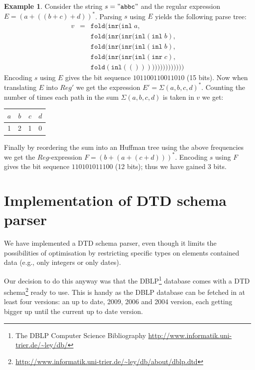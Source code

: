 \documentclass[a4paper, oneside]{memoir}
\theoremstyle{definition}
\newtheorem{example}{Example}
\begin{document}
\begin{example}
  Consider the string $s = \mathtt{"abbc"}$ and the regular expression $E = (a +
  ((b + c) + d))^{*}$. Parsing $s$ using $E$ yields the following parse tree:
\[
\begin{array}{rcl}
  v & = & \mathtt{fold}(\mathtt{inr}(\mathtt{inl} \; a, \\
    &   & \mathtt{fold}(\mathtt{inr}(\mathtt{inr}(\mathtt{inl}(\mathtt{inl} \; b), \\
    &   & \mathtt{fold}(\mathtt{inr}(\mathtt{inr}(\mathtt{inl}(\mathtt{inl} \; b), \\
    &   & \mathtt{fold}(\mathtt{inr}(\mathtt{inr}(\mathtt{inl}(\mathtt{inr} \; c), \\
    &   & \mathtt{fold}(\mathtt{inl}(()))))))))))))))
\end{array}
\]
\noindent Encoding $s$ using $E$ gives the bit sequence $101100110011010$ (15
bits). Now when translating $E$ into $Reg'$ we get the expression $E' =
\Sigma{(a, b, c, d)}^{*}$. Counting the number of times each path in the sum
$\Sigma{(a, b, c, d)}$ is taken in $v$ we get:

\begin{center}
\begin{tabular}{c|c|c|c}
$a$ & $b$ & $c$ & $d$ \\
\hline
1   & 2   & 1   & 0
\end{tabular}
\end{center}

\noindent Finally by reordering the sum into an Huffman tree using the above
frequencies we get the $Reg$-expression $F = (b + (a + (c + d)))^{*}$. Encoding
$s$ using $F$ gives the bit sequence $110101011100$ (12 bits); thus we have
gained 3 bits.

\end{example}

\chapter{Implementation of DTD schema parser}

We have implemented a DTD schema parser, even though it limits the possibilities
of optimisation by restricting specific types on elements contained data (e.g.,
only integers or only dates).

Our decision to do this anyway was that the DBLP\footnote{The DBLP Computer
  Science Bibliography \url{http://www.informatik.uni-trier.de/~ley/db/}}
database comes with a DTD
schema\footnote{\url{http://www.informatik.uni-trier.de/~ley/db/about/dblp.dtd}}
ready to use. This is handy as the DBLP database can be fetched in at least four
versions: an up to date, 2009, 2006 and 2004 version, each getting bigger
up until the current up to date version.
\end{document}
